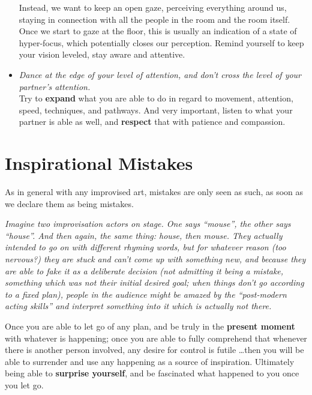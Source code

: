 \begin{itemize}
    Instead, we want to keep an open gaze, perceiving everything around us, staying in connection with all the people in the room and the room itself.
    Once we start to gaze at the floor, this is usually an indication of a state of hyper-focus, which potentially closes our perception.
    Remind yourself to keep your vision leveled, stay aware and attentive.
    \item [] \textit{Dance at the edge of your level of attention, and don't cross the level of your partner's attention.} \\
    Try to \textbf{expand} what you are able to do in regard to movement, attention, speed, techniques, and pathways.
    And very important, listen to what your partner is able as well, and \textbf{respect} that with patience and compassion.
\end{itemize}

\section{Inspirational Mistakes}\label{sec:inspirational-mistakes}

As in general with any improvised art, mistakes are only seen as such, as soon as we declare them as being mistakes.

\begin{displayquote}
    \textit{
Imagine two improvisation actors on stage.
One says ``mouse'', the other says ``house''.
And then again, the same thing: house, then mouse.
They actually intended to go on with different rhyming words, but for whatever reason (too nervous?) they are stuck and can't come up with something new, and because they are able to fake it as a deliberate decision (not admitting it being a mistake, something which was not their initial desired goal; when things don't go according to a fixed plan), people in the audience might be amazed by the ``post-modern acting skills'' and interpret something into it which is actually not there.
    }
\end{displayquote}

Once you are able to let go of any plan, and be truly in the \textbf{present moment} with whatever is happening; once you are able to fully comprehend that whenever there is another person involved, any desire for control is futile \ldots then you will be able to surrender and use any happening as a source of inspiration.
Ultimately being able to \textbf{surprise yourself}, and be fascinated what happened to you once you let go.
